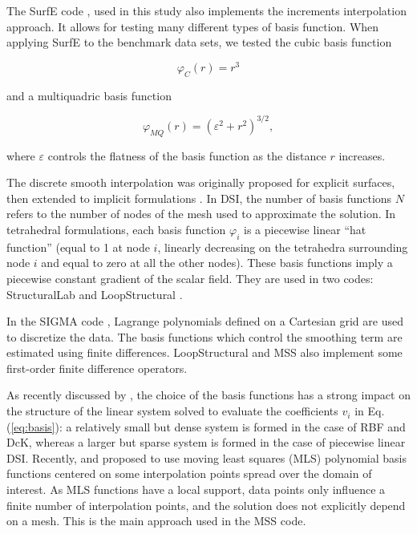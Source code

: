 \documentclass[preprint]{ring20}
\begin{document}
The SurfE code \citep{Hillier2014MG}, used in this study also implements the increments interpolation approach. It allows for testing many different types of basis function. When applying SurfE to the benchmark data sets, we tested the cubic basis function 

\begin{equation}
\varphi_{C}(r) = r^3
\end{equation}

\noindent and a multiquadric basis function

\begin{equation}
\varphi_{MQ}(r) = (\varepsilon^2 + r^2)^{3/2},
\end{equation}

\noindent where $\varepsilon$ controls the flatness of the basis function as the distance $r$ increases. 

The discrete smooth interpolation \citep[DSI, ][]{Mallet1992CD} was originally proposed for explicit surfaces, then extended to implicit formulations \citep{Frank2007CG,Caumon2013GaRSITo,Souche20137ECEISE2,Laurent2016MG,Irakarama2021MG}. In DSI, the number of basis functions $N$ refers to the number of nodes of the mesh used to approximate the solution. In tetrahedral formulations, each basis function $\varphi_i$ is a piecewise linear ``hat function'' (equal to 1 at node $i$, linearly decreasing on the tetrahedra surrounding node $i$ and equal to zero at all the other nodes). These basis functions imply a piecewise constant gradient of the scalar field. They are used in two codes: StructuralLab \citep{Frank2007CG,Caumon2013GaRSITo} and LoopStructural \citep{Grose2021GMDa}. 

In the SIGMA code \cite{Irakarama2021MG}, Lagrange polynomials defined on a Cartesian grid are used to discretize the data. The basis functions which control the smoothing term are estimated using finite differences. LoopStructural and MSS also implement some first-order finite difference operators. 

As recently discussed by \citet{Renaudeau2019MG}, the choice of the basis functions has a strong impact on the structure of the linear system solved to evaluate the coefficients $v_i$ in Eq. (\ref{eq:basis}): a relatively small but dense system is formed in the case of RBF and DcK, whereas a larger but sparse system is formed in the case of piecewise linear DSI. Recently, \citet{Renaudeau2019MG} and \citet{Manchuk2019CG} proposed to use moving least squares (MLS) polynomial basis functions centered on some interpolation points spread over the domain of interest. As MLS functions have a local support, data points only influence a finite number of interpolation points, and the solution does not explicitly depend on a mesh. This is the main approach used in the MSS code. 
\end{document}

